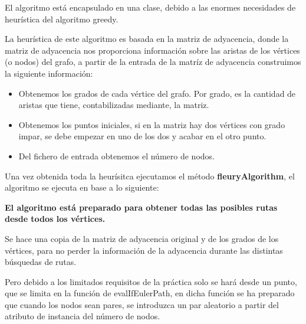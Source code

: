 El algoritmo está encapsulado en una clase, debido a las enormes necesidades de heurística del algoritmo greedy.
\vspace{5mm}

La heurística de este algoritmo es basada en la matriz de adyacencia, donde la matriz de adyacencia nos proporciona información sobre las aristas de los vértices (o nodos) del grafo, a partir de la entrada de la matríz de adyacencia construimos la siguiente información:

\begin{itemize}
    \item Obtenemos los grados de cada vértice del grafo. Por grado, es la cantidad de aristas que tiene, contabilizadas mediante, la matriz.
    \item Obtenemos los puntos iniciales, si en la matriz hay dos vértices con grado impar, se debe empezar en uno de los dos y acabar en el otro punto.
    \item Del fichero de entrada obtenemos el número de nodos.
\end{itemize}

Una vez obtenida toda la heurísitca ejecutamos el método \textbf{fleuryAlgorithm}, el algoritmo se ejecuta en base a lo siguiente:
\vspace{5mm}

\textbf{El algoritmo está preparado para obtener todas las posibles rutas desde todos los vértices.} 
\vspace{5mm}

Se hace una copia de la matriz de adyacencia original y de los grados de los vértices, para no perder la información de la adyacencia durante las distintas búsquedas de rutas.
\vspace{5mm}

Pero debido a los limitados requisitos de la práctica solo se hará desde un punto, que se limita en la función de evalIfEulerPath, en dicha función se ha preparado que cuando los nodos sean pares, se introduzca un par aleatorio a partir del atributo de instancia del número de nodos.

